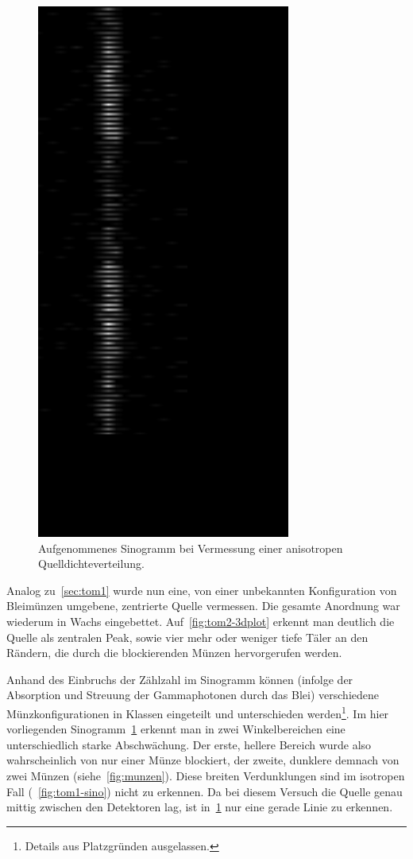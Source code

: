 \documentclass[slug=PET, room=Andreas-Schubert-Bau\,\ 424A,
supervisor=Carsten\ Bittrich, coursedate=10.\ 01.\ 2020, ngerman]{../../Lab_Report_LaTeX/lab_report}
\begin{document}
\begin{figure}[hb]
  \centering \includegraphics[width=.3\textwidth,
  angle=90]{../messungen/Tom2/tom2_Sinogramm.PNG}
  \caption{Aufgenommenes Sinogramm bei Vermessung einer anisotropen
    Quelldichteverteilung.}
  \label{fig:tom2}
\end{figure}

Analog zu~\ref{sec:tom1} wurde nun eine, von einer unbekannten
Konfiguration von Bleim\"unzen umgebene, zentrierte Quelle
vermessen. Die gesamte Anordnung war wiederum in Wachs eingebettet.
Auf~\ref{fig:tom2-3dplot} erkennt man deutlich die Quelle als
zentralen Peak, sowie vier mehr oder weniger tiefe T\"aler an den
R\"andern, die durch die blockierenden M\"unzen hervorgerufen werden.

Anhand des Einbruchs der Z\"ahlzahl im Sinogramm k\"onnen (infolge der
Absorption und Streuung der Gammaphotonen durch das Blei) verschiedene
M\"unzkonfigurationen in Klassen eingeteilt und unterschieden
werden\footnote{Details aus Platzgr\"unden ausgelassen.}. Im hier
vorliegenden Sinogramm~\ref{fig:tom2} erkennt man in zwei
Winkelbereichen eine unterschiedlich starke Abschw\"achung. Der erste,
hellere Bereich wurde also wahrscheinlich von nur einer M\"unze
blockiert, der zweite, dunklere demnach von zwei M\"unzen
(siehe~\ref{fig:munzen}). Diese breiten Verdunklungen sind im
isotropen Fall (~\ref{fig:tom1-sino}) nicht zu erkennen. Da bei diesem
Versuch die Quelle genau mittig zwischen den Detektoren lag, ist
in~\ref{fig:tom2} nur eine gerade Linie zu erkennen.
\end{document}
